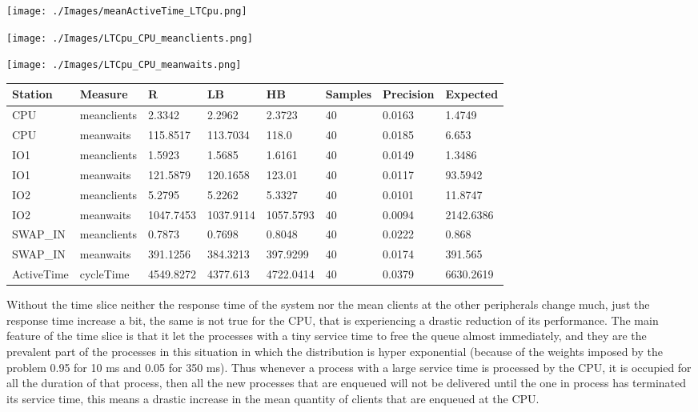 \documentclass[12pt,a4paper]{article}
\begin{document}
\texttt{[image: ./Images/meanActiveTime\_LTCpu.png]}


\texttt{[image: ./Images/LTCpu\_CPU\_meanclients.png]}


\texttt{[image: ./Images/LTCpu\_CPU\_meanwaits.png]}


\begin{table}[!ht]
    \centering
    \begin{tabular}{|l|l|l|l|l|l|l|l|}
    \hline
    Station & Measure & R & LB & HB & Samples & Precision & Expected \\ \hline
    CPU & meanclients & 2.3342 & 2.2962 & 2.3723 & 40 & 0.0163 & 1.4749 \\ \hline
    CPU & meanwaits & 115.8517 & 113.7034 & 118.0 & 40 & 0.0185 & 6.653 \\ \hline
    IO1 & meanclients & 1.5923 & 1.5685 & 1.6161 & 40 & 0.0149 & 1.3486 \\ \hline
    IO1 & meanwaits & 121.5879 & 120.1658 & 123.01 & 40 & 0.0117 & 93.5942 \\ \hline
    IO2 & meanclients & 5.2795 & 5.2262 & 5.3327 & 40 & 0.0101 & 11.8747 \\ \hline
    IO2 & meanwaits & 1047.7453 & 1037.9114 & 1057.5793 & 40 & 0.0094 & 2142.6386 \\ \hline
    SWAP\_IN & meanclients & 0.7873 & 0.7698 & 0.8048 & 40 & 0.0222 & 0.868 \\ \hline
    SWAP\_IN & meanwaits & 391.1256 & 384.3213 & 397.9299 & 40 & 0.0174 & 391.565 \\ \hline
    ActiveTime & cycleTime & 4549.8272 & 4377.613 & 4722.0414 & 40 & 0.0379 & 6630.2619 \\ \hline
    \end{tabular}
\end{table}

Without the time slice neither the response time of the system nor the mean clients at the other peripherals change much, just the response time increase a bit, the same is not true for the CPU, that is experiencing a drastic reduction of its performance. The main feature of the time slice is that it let the processes with a tiny service time to free the queue almost immediately, and they are the prevalent part of the processes in this situation in which the distribution is hyper exponential (because of the weights imposed by the problem 0.95 for 10 ms and 0.05 for 350 ms). Thus whenever a process with a large service time is processed by the CPU, it is occupied for all the duration of that process, then all the new processes that are enqueued will not be delivered until the one in process has terminated its service time, this means a drastic increase in the mean quantity of clients that are enqueued at the CPU.
\end{document}

